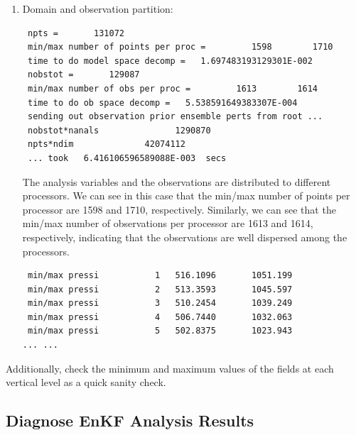 \begin{enumerate}
\item Domain and observation partition:
\begin{footnotesize}
\begin{verbatim}
 npts =       131072
 min/max number of points per proc =         1598        1710
 time to do model space decomp =   1.697483193129301E-002
 nobstot =       129087
 min/max number of obs per proc =         1613        1614
 time to do ob space decomp =   5.538591649383307E-004
 sending out observation prior ensemble perts from root ...
 nobstot*nanals               1290870
 npts*ndim              42074112
 ... took   6.416106596589088E-003  secs
\end{verbatim}
\end{footnotesize}

The analysis variables and the observations are distributed to different processors. We can see in this case that the min/max number of points per processor are 1598 and 1710, respectively. Similarly, we can see that the min/max number of observations per processor are 1613 and 1614, respectively, indicating that the observations are well dispersed among the processors.

\begin{footnotesize}
\begin{verbatim}
 min/max pressi           1   516.1096       1051.199
 min/max pressi           2   513.3593       1045.597
 min/max pressi           3   510.2454       1039.249
 min/max pressi           4   506.7440       1032.063
 min/max pressi           5   502.8375       1023.943
... ...
\end{verbatim}
\end{footnotesize}
\end{enumerate}
Additionally, check the minimum and maximum values of the fields at each vertical level as a quick sanity check.

\subsection{Diagnose EnKF Analysis Results}

